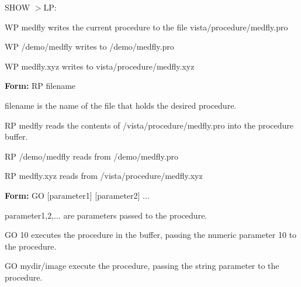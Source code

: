 {\newpage\clearpage
{}%
\begin{hanging}
  \item{SHOW $>$LP:}
\end{hanging}%
\lthtmlfigureZ
\lthtmlcheckvsize\clearpage}

{\newpage\clearpage
{}%
\begin{example}
  \item[WP medfly\hfill]{writes the current procedure to the file
       vista/procedure/medfly.pro}
  \item[WP /demo/medfly\hfill]{writes to /demo/medfly.pro}
  \item[WP medfly.xyz\hfill]{writes to vista/procedure/medfly.xyz}
\end{example}%
\lthtmlfigureZ
\lthtmlcheckvsize\clearpage}

{\newpage\clearpage
{}%
\begin{command}
  \item[\textbf{Form: } RP filename\hfill]{}
  \item[filename]{is the name of the file that holds the desired procedure.}
\end{command}%
\lthtmlfigureZ
\lthtmlcheckvsize\clearpage}

{\newpage\clearpage
{}%
\begin{example}
  \item[RP medfly\hfill]{reads the contents of /vista/procedure/medfly.pro
       into the procedure buffer.}
  \item[RP /demo/medfly\hfill]{reads from /demo/medfly.pro}
  \item[RP medfly.xyz\hfill]{reads from /vista/procedure/medfly.xyz}
\end{example}%
\lthtmlfigureZ
\lthtmlcheckvsize\clearpage}

{\newpage\clearpage
{}%
\begin{command}
  \item[\textbf{Form: } GO {[parameter1]} {[parameter2]} ...]{}
  \item[parameter1,2,...]{are parameters passed to the procedure.}
\end{command}%
\lthtmlfigureZ
\lthtmlcheckvsize\clearpage}

{\newpage\clearpage
{}%
\begin{example}
  \item[GO 10\hfill]{executes the procedure in the buffer,
       passing the numeric parameter 10 to the procedure.}
  \item[GO mydir/image\hfill]{execute the procedure, passing the
        string parameter to the procedure.}
\end{example}%
\lthtmlfigureZ
\lthtmlcheckvsize\clearpage}

